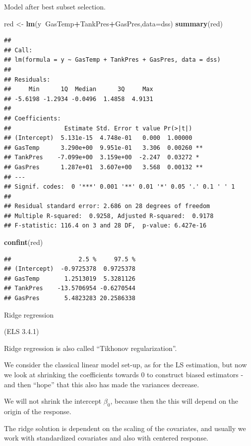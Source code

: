 \documentclass[
  ignorenonframetext,
]{beamer}
\newenvironment{Shaded}{\begin{snugshade}}{\end{snugshade}}
\newcommand{\DataTypeTok}[1]{\textcolor[rgb]{0.13,0.29,0.53}{#1}}
\newcommand{\KeywordTok}[1]{\textcolor[rgb]{0.13,0.29,0.53}{\textbf{#1}}}
\newcommand{\NormalTok}[1]{#1}
\newcommand{\OperatorTok}[1]{\textcolor[rgb]{0.81,0.36,0.00}{\textbf{#1}}}
\newcommand{\StringTok}[1]{\textcolor[rgb]{0.31,0.60,0.02}{#1}}
\begin{document}
\begin{frame}[fragile]

Model after best subset selection.

\begin{Shaded}
\begin{Highlighting}[]
\NormalTok{red <-}\StringTok{ }\KeywordTok{lm}\NormalTok{(y}\OperatorTok{~}\NormalTok{GasTemp}\OperatorTok{+}\NormalTok{TankPres}\OperatorTok{+}\NormalTok{GasPres,}\DataTypeTok{data=}\NormalTok{dss)}
\KeywordTok{summary}\NormalTok{(red)}
\end{Highlighting}
\end{Shaded}

\begin{verbatim}
## 
## Call:
## lm(formula = y ~ GasTemp + TankPres + GasPres, data = dss)
## 
## Residuals:
##     Min      1Q  Median      3Q     Max 
## -5.6198 -1.2934 -0.0496  1.4858  4.9131 
## 
## Coefficients:
##               Estimate Std. Error t value Pr(>|t|)   
## (Intercept)  5.131e-15  4.748e-01   0.000  1.00000   
## GasTemp      3.290e+00  9.951e-01   3.306  0.00260 **
## TankPres    -7.099e+00  3.159e+00  -2.247  0.03272 * 
## GasPres      1.287e+01  3.607e+00   3.568  0.00132 **
## ---
## Signif. codes:  0 '***' 0.001 '**' 0.01 '*' 0.05 '.' 0.1 ' ' 1
## 
## Residual standard error: 2.686 on 28 degrees of freedom
## Multiple R-squared:  0.9258, Adjusted R-squared:  0.9178 
## F-statistic: 116.4 on 3 and 28 DF,  p-value: 6.427e-16
\end{verbatim}

\begin{Shaded}
\begin{Highlighting}[]
\KeywordTok{confint}\NormalTok{(red)}
\end{Highlighting}
\end{Shaded}

\begin{verbatim}
##                   2.5 %     97.5 %
## (Intercept)  -0.9725378  0.9725378
## GasTemp       1.2513019  5.3281126
## TankPres    -13.5706954 -0.6270544
## GasPres       5.4823283 20.2586338
\end{verbatim}

\end{frame}

\begin{frame}{Ridge regression}
\protect\hypertarget{ridge-regression}{}

(ELS 3.4.1)

Ridge regression is also called ``Tikhonov regularization''.

We consider the classical linear model set-up, as for the LS estimation,
but now we look at shrinking the coefficients towards 0 to construct
biased estimators - and then ``hope'' that this also has made the
variances decrease.

We will not shrink the intercept \(\beta_0\), because then the this will
depend on the origin of the response.

The ridge solution is dependent on the scaling of the covariates, and
usually we work with standardized covariates and also with centered
response.

\end{frame}
\end{document}
